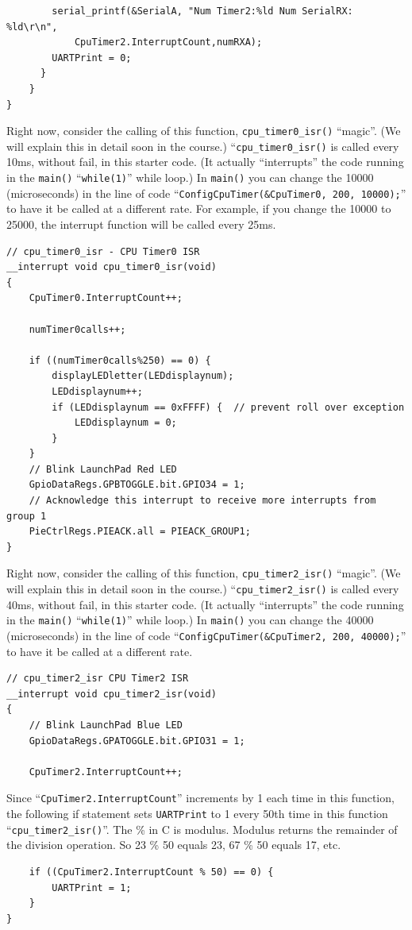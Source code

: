 \documentclass[11pt]{article}
\begin{document}
%
\begin{verbatim}
        serial_printf(&SerialA, "Num Timer2:%ld Num SerialRX: %ld\r\n",
            CpuTimer2.InterruptCount,numRXA);
        UARTPrint = 0;
      }
    }
}
\end{verbatim}
%
Right now, consider the calling of this function, \texttt{cpu\_timer0\_isr()} “magic”. (We will explain this in detail soon in the course.) “\texttt{cpu\_timer0\_isr()} is called every 10ms, without fail, in this starter code. (It actually “interrupts” the code running in the \texttt{main()} “\texttt{while(1)}” while loop.)  In \texttt{main()} you can change the 10000 (microseconds) in the line of code “\texttt{ConfigCpuTimer(&CpuTimer0, 200, 10000);}” to have it be called at a different rate. For example, if you change the 10000 to 25000, the interrupt function will be called every 25ms.
%
\begin{verbatim}
// cpu_timer0_isr - CPU Timer0 ISR
__interrupt void cpu_timer0_isr(void)
{
    CpuTimer0.InterruptCount++;

    numTimer0calls++;

    if ((numTimer0calls%250) == 0) {
        displayLEDletter(LEDdisplaynum);
        LEDdisplaynum++;
        if (LEDdisplaynum == 0xFFFF) {  // prevent roll over exception
            LEDdisplaynum = 0;
        }
    }
    // Blink LaunchPad Red LED
    GpioDataRegs.GPBTOGGLE.bit.GPIO34 = 1;
    // Acknowledge this interrupt to receive more interrupts from group 1
    PieCtrlRegs.PIEACK.all = PIEACK_GROUP1;
}
\end{verbatim}
%
Right now, consider the calling of this function, \texttt{cpu\_timer2\_isr()} “magic”. (We will explain this in detail soon in the course.) “\texttt{cpu\_timer2\_isr()} is called every 40ms, without fail, in this starter code. (It actually “interrupts” the code running in the \texttt{main()} “\texttt{while(1)}” while loop.)  In \texttt{main()} you can change the 40000 (microseconds) in the line of code “\texttt{ConfigCpuTimer(&CpuTimer2, 200, 40000);}” to have it be called at a different rate.
%
\begin{verbatim}
// cpu_timer2_isr CPU Timer2 ISR
__interrupt void cpu_timer2_isr(void)
{
    // Blink LaunchPad Blue LED
    GpioDataRegs.GPATOGGLE.bit.GPIO31 = 1;

    CpuTimer2.InterruptCount++;
\end{verbatim}
%
Since “\texttt{CpuTimer2.InterruptCount}” increments by 1 each time in this function, the following if statement sets \texttt{UARTPrint} to 1 every 50th time in this function “\texttt{cpu\_timer2\_isr()}”. The \% in C is modulus. Modulus returns the remainder of the division operation. So 23 \% 50 equals 23, 67 \% 50 equals 17, etc.
%
\begin{verbatim}
    if ((CpuTimer2.InterruptCount % 50) == 0) {
        UARTPrint = 1;
    }
}
\end{verbatim}
%
\end{document}
